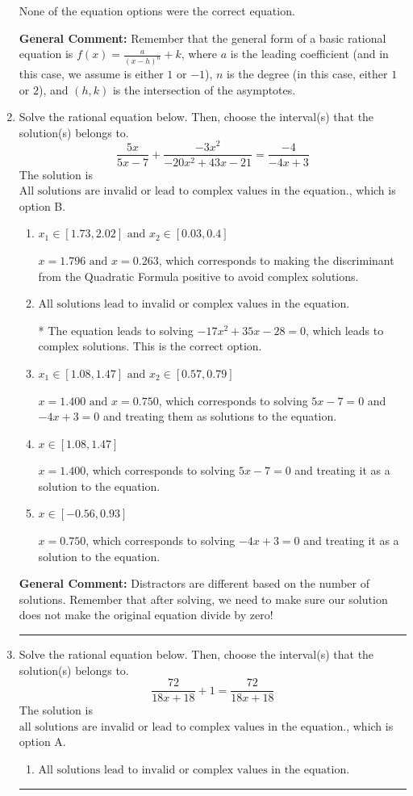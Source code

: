\documentclass{extbook}[14pt]
\newcommand{\litem}[1]{\item #1

\rule{\textwidth}{0.4pt}}
\begin{document}
\begin{enumerate}
{\begin{enumerate}[label=\Alph*.]
None of the equation options were the correct equation.
\end{enumerate}

\textbf{General Comment:} Remember that the general form of a basic rational equation is $ f(x) = \frac{a}{(x-h)^n} + k$, where $a$ is the leading coefficient (and in this case, we assume is either $1$ or $-1$), $n$ is the degree (in this case, either $1$ or $2$), and $(h, k)$ is the intersection of the asymptotes.
}
\litem{
Solve the rational equation below. Then, choose the interval(s) that the solution(s) belongs to.
\[ \frac{5x}{5x -7} + \frac{-3x^{2}}{-20x^{2} +43 x -21} = \frac{-4}{-4x + 3} \]The solution is \( \text{All solutions are invalid or lead to complex values in the equation.} \), which is option B.\begin{enumerate}[label=\Alph*.]
\item \( x_1 \in [1.73, 2.02] \text{ and } x_2 \in [0.03,0.4] \)

$x = 1.796 \text{ and } x = 0.263$, which corresponds to making the discriminant from the Quadratic Formula positive to avoid complex solutions.
\item \( \text{All solutions lead to invalid or complex values in the equation.} \)

* The equation leads to solving $-17x^{2} +35 x -28=0$, which leads to complex solutions. This is the correct option.
\item \( x_1 \in [1.08, 1.47] \text{ and } x_2 \in [0.57,0.79] \)

$x = 1.400 \text{ and } x = 0.750$, which corresponds to solving $5x -7 = 0$ and $-4x + 3 = 0$ and treating them as solutions to the equation.
\item \( x \in [1.08,1.47] \)

$x = 1.400$, which corresponds to solving $5x -7 = 0$ and treating it as a solution to the equation.
\item \( x \in [-0.56,0.93] \)

$x = 0.750$, which corresponds to solving $-4x + 3 = 0$ and treating it as a solution to the equation.
\end{enumerate}

\textbf{General Comment:} Distractors are different based on the number of solutions. Remember that after solving, we need to make sure our solution does not make the original equation divide by zero!
}
\litem{
Solve the rational equation below. Then, choose the interval(s) that the solution(s) belongs to.
\[ \frac{72}{18x + 18} + 1 = \frac{72}{18x + 18} \]The solution is \( \text{all solutions are invalid or lead to complex values in the equation.} \), which is option A.\begin{enumerate}[label=\Alph*.]
\item \( \text{All solutions lead to invalid or complex values in the equation.} \)


\end{enumerate}}
\end{enumerate}
\end{document}
